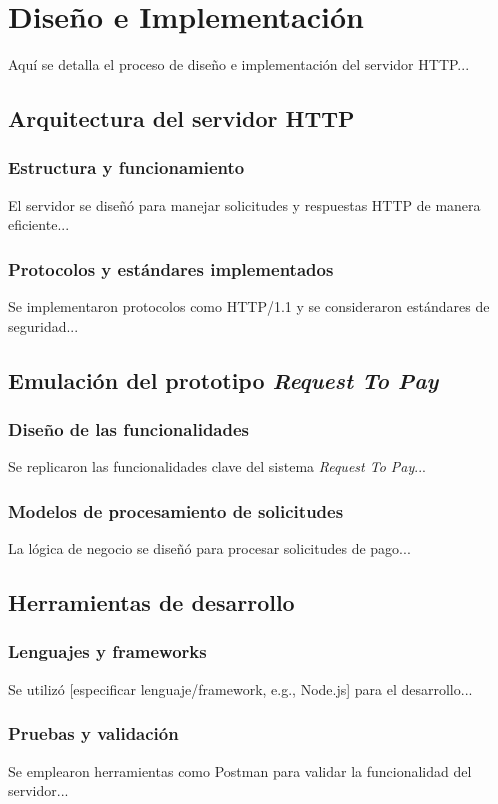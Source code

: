 \section{Diseño e Implementación}
\label{sec:DisenoImplementacion}
Aquí se detalla el proceso de diseño e implementación del servidor HTTP...

\subsection{Arquitectura del servidor HTTP}
\label{subsec:ArquitecturaHTTP}
\subsubsection{Estructura y funcionamiento}
\label{subsubsec:EstructuraFuncionamiento}
El servidor se diseñó para manejar solicitudes y respuestas HTTP de manera eficiente...

\subsubsection{Protocolos y estándares implementados}
\label{subsubsec:Protocolos}
Se implementaron protocolos como HTTP/1.1 y se consideraron estándares de seguridad...

\subsection{Emulación del prototipo \textit{Request To Pay}}
\label{subsec:EmulacionRTP}
\subsubsection{Diseño de las funcionalidades}
\label{subsubsec:DisenoFuncionalidades}
Se replicaron las funcionalidades clave del sistema \textit{Request To Pay}...

\subsubsection{Modelos de procesamiento de solicitudes}
\label{subsubsec:ProcesamientoSolicitudes}
La lógica de negocio se diseñó para procesar solicitudes de pago...

\subsection{Herramientas de desarrollo}
\label{subsec:HerramientasDesarrollo}
\subsubsection{Lenguajes y frameworks}
\label{subsubsec:LenguajesFrameworks}
Se utilizó [especificar lenguaje/framework, e.g., Node.js] para el desarrollo...

\subsubsection{Pruebas y validación}
\label{subsubsec:PruebasValidacion}
Se emplearon herramientas como Postman para validar la funcionalidad del servidor...
